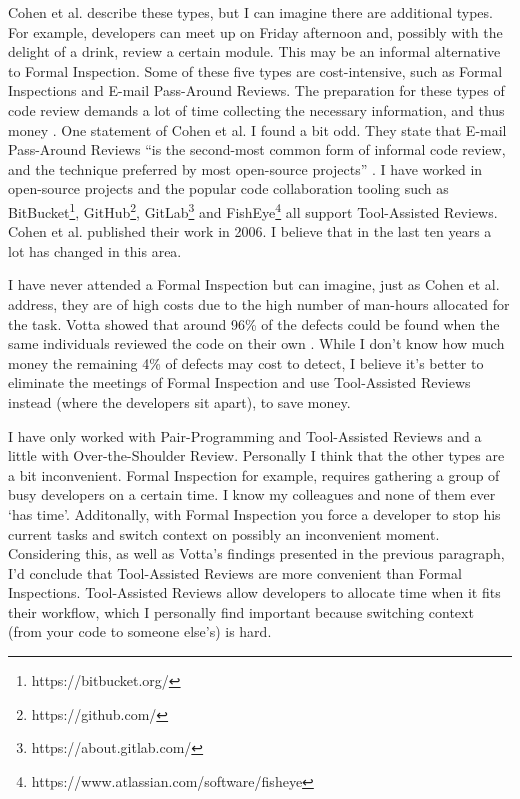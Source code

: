 Cohen et al. describe these types, but I can imagine there are additional types.
For example, developers can meet up on Friday afternoon and, possibly with the delight of a drink, review a certain module.
This may be an informal alternative to Formal Inspection.
Some of these five types are cost-intensive, such as Formal Inspections and E-mail Pass-Around Reviews.
The preparation for these types of code review demands a lot of time collecting the necessary information, and thus money \autocite[23--38]{cohen2006best}.
One statement of Cohen et al. I found a bit odd.
They state that E-mail Pass-Around Reviews ``is the second-most common form of informal code review, and the technique preferred by most open-source projects'' \autocite[30]{cohen2006best}.
I have worked in open-source projects and the popular code collaboration tooling such as
BitBucket\footnote{https://bitbucket.org/},
GitHub\footnote{https://github.com/},
GitLab\footnote{https://about.gitlab.com/}
and FishEye\footnote{https://www.atlassian.com/software/fisheye}
all support Tool-Assisted Reviews.
Cohen et al. published their work in 2006. I believe that in the last ten years a lot has changed in this area.

I have never attended a Formal Inspection but can imagine, just as Cohen et al. address, they are of high costs due to the high number of man-hours allocated for the task.
Votta showed that around 96\% of the defects could be found when the same individuals reviewed the code on their own \autocite[110]{Votta:1993:INM:256428.167070}.
While I don't know how much money the remaining 4\% of defects may cost to detect, I believe it's better to eliminate the meetings of Formal Inspection and use Tool-Assisted Reviews instead (where the developers sit apart), to save money.

I have only worked with Pair-Programming and Tool-Assisted Reviews and a little with Over-the-Shoulder Review. Personally I think that the other types are a bit inconvenient.
Formal Inspection for example, requires gathering a group of busy developers on a certain time.
I know my colleagues and none of them ever `has time'.
Additonally, with Formal Inspection you force a developer to stop his current tasks and switch context on possibly an inconvenient moment.
Considering this, as well as Votta's findings presented in the previous paragraph, I'd conclude that Tool-Assisted Reviews are more convenient than Formal Inspections.
Tool-Assisted Reviews allow developers to allocate time when it fits their workflow, which I personally find important because switching context (from your code to someone else's) is hard.

